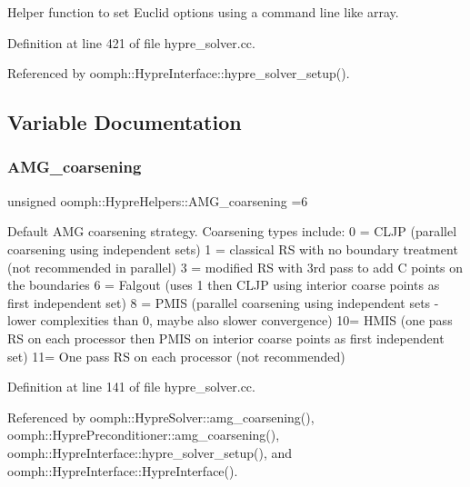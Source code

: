 Helper function to set Euclid options using a command line like array. 



Definition at line 421 of file hypre\+\_\+solver.\+cc.



Referenced by oomph\+::\+Hypre\+Interface\+::hypre\+\_\+solver\+\_\+setup().



\subsection{Variable Documentation}
\mbox{\label{namespaceoomph_1_1HypreHelpers_a8d34acec927aff8f150737afaec9651a}} 
\subsubsection{\texorpdfstring{A\+M\+G\+\_\+coarsening}{AMG\_coarsening}}
{\footnotesize\ttfamily unsigned oomph\+::\+Hypre\+Helpers\+::\+A\+M\+G\+\_\+coarsening =6}



Default A\+MG coarsening strategy. Coarsening types include\+: 0 = C\+L\+JP (parallel coarsening using independent sets) 1 = classical RS with no boundary treatment (not recommended in parallel) 3 = modified RS with 3rd pass to add C points on the boundaries 6 = Falgout (uses 1 then C\+L\+JP using interior coarse points as first independent set) 8 = P\+M\+IS (parallel coarsening using independent sets -\/ lower complexities than 0, maybe also slower convergence) 10= H\+M\+IS (one pass RS on each processor then P\+M\+IS on interior coarse points as first independent set) 11= One pass RS on each processor (not recommended) 



Definition at line 141 of file hypre\+\_\+solver.\+cc.



Referenced by oomph\+::\+Hypre\+Solver\+::amg\+\_\+coarsening(), oomph\+::\+Hypre\+Preconditioner\+::amg\+\_\+coarsening(), oomph\+::\+Hypre\+Interface\+::hypre\+\_\+solver\+\_\+setup(), and oomph\+::\+Hypre\+Interface\+::\+Hypre\+Interface().

\mbox{\label{namespaceoomph_1_1HypreHelpers_aa3d3b58e30a8eba0adce2c335d2fc437}} 
